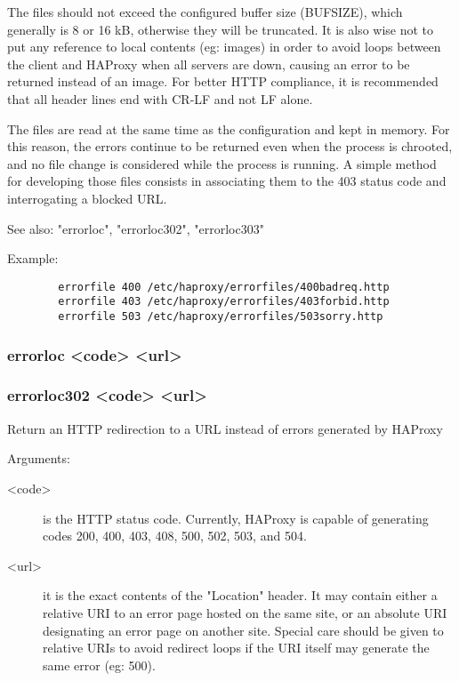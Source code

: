   The files should not exceed the configured buffer size (BUFSIZE), which
  generally is 8 or 16 kB, otherwise they will be truncated. It is also wise
  not to put any reference to local contents (eg: images) in order to avoid
  loops between the client and HAProxy when all servers are down, causing an
  error to be returned instead of an image. For better HTTP compliance, it is
  recommended that all header lines end with CR-LF and not LF alone.

  The files are read at the same time as the configuration and kept in memory.
  For this reason, the errors continue to be returned even when the process is
  chrooted, and no file change is considered while the process is running. A
  simple method for developing those files consists in associating them to the
  403 status code and interrogating a blocked URL.

  See also: "errorloc", "errorloc302", "errorloc303"

  Example:
  \begin{verbatim}
        errorfile 400 /etc/haproxy/errorfiles/400badreq.http
        errorfile 403 /etc/haproxy/errorfiles/403forbid.http
        errorfile 503 /etc/haproxy/errorfiles/503sorry.http
  \end{verbatim}

\subsubsection[errorloc]{errorloc <code> <url>}
\subsubsection[errorloc302]{errorloc302 <code> <url>}
  Return an HTTP redirection to a URL instead of errors generated by HAProxy
  
  
  Arguments:
  \begin{description}
  \item[<code>]    is the HTTP status code. Currently, HAProxy is capable of
              generating codes 200, 400, 403, 408, 500, 502, 503, and 504.

  \item[<url>]     it is the exact contents of the "Location" header. It may contain
              either a relative URI to an error page hosted on the same site,
              or an absolute URI designating an error page on another site.
              Special care should be given to relative URIs to avoid redirect
              loops if the URI itself may generate the same error (eg: 500).
  \end{description}

